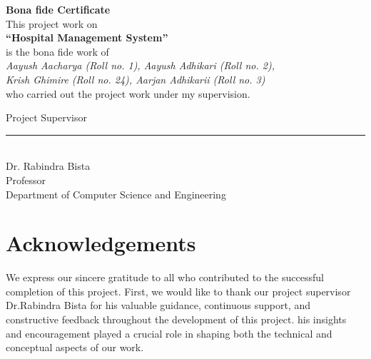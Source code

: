 \documentclass[12pt,a4paper]{report}
\begin{document}
\thispagestyle{plain}

\vspace*{\fill}

\begin{center}
{\Large\bfseries Bona fide Certificate}\\[1.2cm]
This project work on\\[4pt]
{\bfseries ``Hospital Management System''}\\[4pt]
is the bona fide work of\\[6pt]
\emph{Aayush Aacharya (Roll no. 1), Aayush Adhikari (Roll no. 2),\\
Krish Ghimire (Roll no. 24), Aarjan Adhikarii (Roll no. 3)}\\[6pt]
who carried out the project work under my supervision.
\end{center}

\vspace{2.5cm}

\noindent

Project Supervisor\\[2pt]

\rule{6cm}{0.4pt}\\
Dr. Rabindra Bista\\                                              %
Professor\\
Department of Computer Science and Engineering

\vspace*{\fill}
\newpage

\chapter*{Acknowledgements}
We express our sincere gratitude to all who contributed to the successful completion
of this project.
First, we would like to thank our project supervisor Dr.Rabindra Bista for his valuable guidance,
continuous support, and constructive feedback throughout the development of this
project. his insights and encouragement played a crucial role in shaping both the
technical and conceptual aspects of our work.
\end{document}
